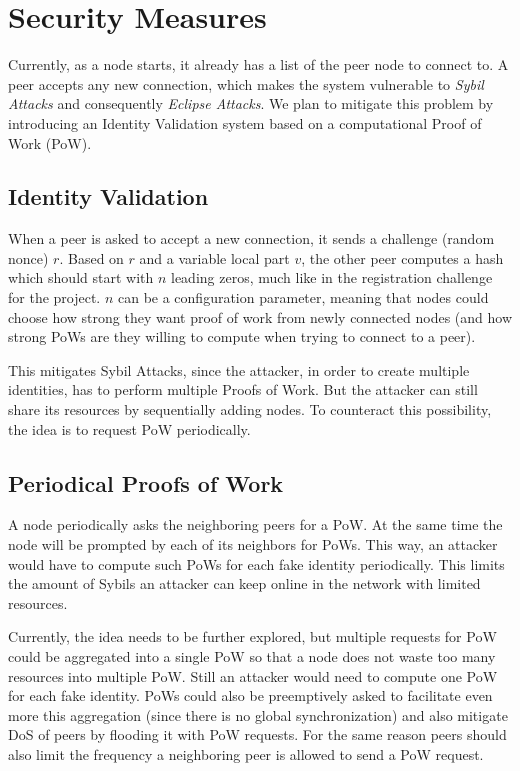 \documentclass[a4paper,english,10pt,NET]{tumarticle}
\begin{document}
\section{Security Measures} \label{sec:security}

Currently, as a node starts, it already has a list of the peer node to connect to. A peer accepts any new connection, which makes the system vulnerable to \textit{Sybil Attacks} and consequently \textit{Eclipse Attacks}. We plan to mitigate this problem by introducing an Identity Validation system based on a computational Proof of Work (PoW).

\subsection{Identity Validation}

When a peer is asked to accept a new connection, it sends a challenge (random nonce) $r$. Based on $r$ and a variable local part $v$, the other peer computes a hash which should start with $n$ leading zeros, much like in the registration challenge for the project. $n$ can be a configuration parameter, meaning that nodes could choose how strong they want proof of work from newly connected nodes (and how strong PoWs are they willing to compute when trying to connect to a peer).

This mitigates Sybil Attacks, since the attacker, in order to create multiple identities, has to perform multiple Proofs of Work. But the attacker can still share its resources by sequentially adding nodes. To counteract this possibility, the idea is to request PoW periodically. 

\subsection{Periodical Proofs of Work}

A node periodically asks the neighboring peers for a PoW. At the same time the node will be prompted by each of its neighbors for PoWs. This way, an attacker would have to compute such PoWs for each fake identity periodically. This limits the amount of Sybils an attacker can keep online in the network with limited resources.

Currently, the idea needs to be further explored, but multiple requests for PoW could be aggregated into a single PoW so that a node does not waste too many resources into multiple PoW. Still an attacker would need to compute one PoW for each fake identity. PoWs could also be preemptively asked to facilitate even more this aggregation (since there is no global synchronization) and also mitigate DoS of peers by flooding it with PoW requests. For the same reason peers should also limit the frequency a neighboring peer is allowed to send a PoW request.
\end{document}
